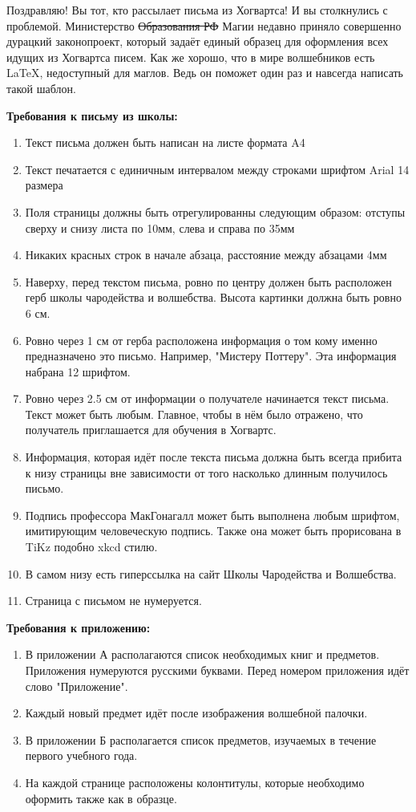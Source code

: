 \documentclass[12pt, a4paper, oneside]{article}
\begin{document}
Поздравляю! Вы тот, кто рассылает письма из Хогвартса! И вы столкнулись с проблемой. Министерство \sout{Образования РФ}  Магии недавно приняло совершенно дурацкий законопроект, который задаёт единый образец для оформления всех идущих из Хогвартса писем. Как же хорошо, что в мире волшебников есть \LaTeX{}, недоступный для маглов. Ведь он поможет один раз и навсегда написать такой шаблон. 

\textbf{Требования к письму из школы:}
\begin{enumerate}
\item Текст письма должен быть написан на листе формата A4
\item Текст печатается с единичным интервалом между строками шрифтом Arial 14 размера
\item Поля страницы должны быть отрегулированны следующим образом: отступы сверху и снизу листа по 10мм, слева и справа по 35мм
\item Никаких красных строк в начале абзаца, расстояние между абзацами 4мм
\item  Наверху, перед текстом письма, ровно по центру должен быть расположен герб школы чародейства и волшебства. Высота картинки должна быть ровно 6 см.
\item  Ровно через 1 см от герба расположена информация о том кому именно предназначено это письмо. Например, "Мистеру Поттеру". Эта информация набрана 12 шрифтом.
\item  Ровно через 2.5 см от информации о получателе начинается текст письма. Текст может быть любым. Главное, чтобы в нём было отражено, что получатель приглашается для обучения в Хогвартс.
\item  Информация, которая идёт после текста письма должна быть всегда прибита к низу страницы вне зависимости от того насколько длинным получилось письмо.
\item Подпись профессора МакГонагалл может быть выполнена любым шрифтом, имитирующим человеческую подпись. Также она может быть прорисована в TiKz подобно xkcd стилю.
\item  В самом низу есть гиперссылка на сайт Школы Чародейства и Волшебства.
\item Страница с письмом не нумеруется.
\end{enumerate}


\textbf{Требования к приложению:}
\begin{enumerate}[resume]
\item  В приложении А располагаются список необходимых книг и предметов.  Приложения нумеруются русскими буквами. Перед номером приложения идёт слово "Приложение".
\item  Каждый новый предмет идёт после изображения волшебной палочки.
\item  В приложении Б располагается список предметов, изучаемых в течение первого учебного года.
\item  На каждой странице расположены колонтитулы, которые необходимо оформить также как в образце.
\end{enumerate}
\end{document}
